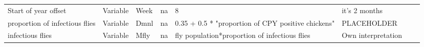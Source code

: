 \begin{landscape}
\begin{longtable}[c]{m{10em}lllm{15em}lll}
Start of year offset                          & Variable & Week                     & na                        & 8                                                                                                                                                                                                                                                                                        & it's 2 months                                                                                                                                                                                &                                                                                                                                                                                                                                       \\
proportion of infectious flies                & Variable & Dmnl                     & na                        & 0.35 + 0.5 * "proportion of CPY positive chickens"                                                                                                                                                                                                                                       & PLACEHOLDER                                                                                                                                                                                  &                                                                                                                                                                                                                                       \\
infectious flies                              & Variable & Mfly                     & na                        & fly population*proportion of infectious flies                                                                                                                                                                                                                                            & Own interpretation                                                                                                                                                                           &                                                                                                                                                                                                                                       \\

\end{longtable}
\end{landscape}
